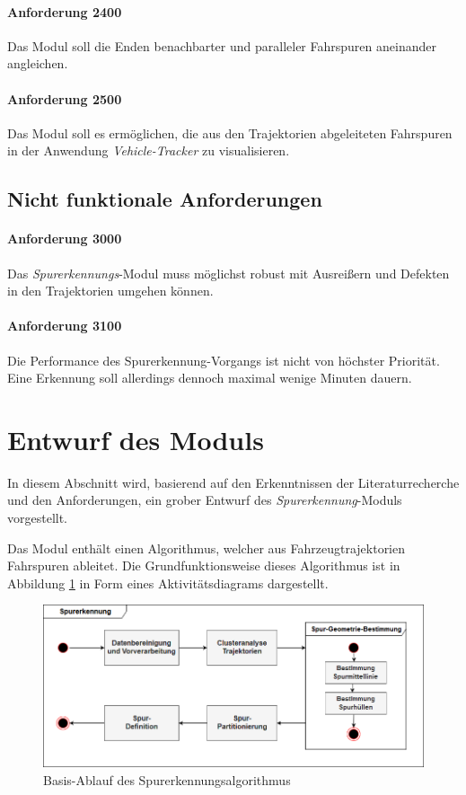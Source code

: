 \paragraph{Anforderung 2400}
Das Modul soll die Enden benachbarter und paralleler Fahrspuren aneinander angleichen.

\paragraph{Anforderung 2500}
Das Modul soll es ermöglichen, die aus den Trajektorien abgeleiteten Fahrspuren in der Anwendung \textit{Vehicle-Tracker}
zu visualisieren.

\subsection{Nicht funktionale Anforderungen}

\paragraph{Anforderung 3000}
Das \textit{Spurerkennungs}-Modul muss möglichst robust mit Ausreißern und Defekten in den Trajektorien umgehen können.

\paragraph{Anforderung 3100}
Die Performance des Spurerkennung-Vorgangs ist nicht von höchster Priorität. Eine Erkennung soll allerdings
dennoch maximal wenige Minuten dauern.

\section{Entwurf des Moduls}
\label{sec:design}

In diesem Abschnitt wird, basierend auf den Erkenntnissen der Literaturrecherche und den Anforderungen,
ein grober Entwurf des \textit{Spurerkennung}-Moduls vorgestellt.

Das Modul enthält einen Algorithmus, welcher aus Fahrzeugtrajektorien Fahrspuren ableitet.
Die Grundfunktionsweise dieses Algorithmus ist in Abbildung \ref{fig:concept_laneDetection_activity}
in Form eines Aktivitätsdiagrams dargestellt.

\begin{figure}[H]
    \centering
    \includegraphics[width=0.8\linewidth]{resources/img/konzeption/activity_laneDetection}
    \caption{Basis-Ablauf des Spurerkennungsalgorithmus}
    \label{fig:concept_laneDetection_activity}
\end{figure}

